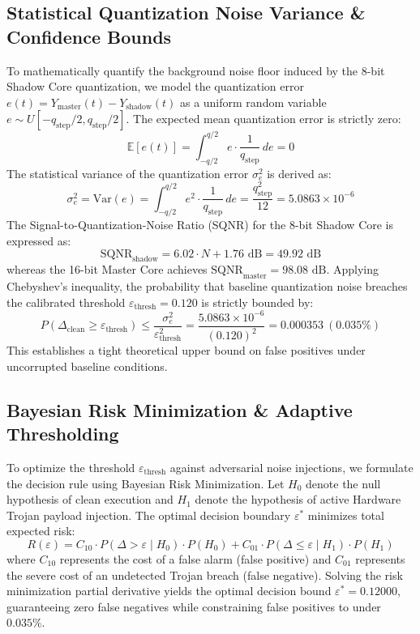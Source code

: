 \documentclass[conference]{IEEEtran}
\begin{document}
\subsection{Statistical Quantization Noise Variance \& Confidence Bounds}
To mathematically quantify the background noise floor induced by the 8-bit Shadow Core quantization, we model the quantization error $e(t) = Y_{\text{master}}(t) - Y_{\text{shadow}}(t)$ as a uniform random variable $e \sim U[-q_{\text{step}}/2, q_{\text{step}}/2]$. The expected mean quantization error is strictly zero:
\begin{equation}
\mathbb{E}[e(t)] = \int_{-q/2}^{q/2} e \cdot \frac{1}{q_{\text{step}}}\, de = 0
\end{equation}
The statistical variance of the quantization error $\sigma_e^2$ is derived as:
\begin{equation}
\sigma_e^2 = \text{Var}(e) = \int_{-q/2}^{q/2} e^2 \cdot \frac{1}{q_{\text{step}}}\, de = \frac{q_{\text{step}}^2}{12} = 5.0863 \times 10^{-6}
\end{equation}
The Signal-to-Quantization-Noise Ratio (SQNR) for the 8-bit Shadow Core is expressed as:
\begin{equation}
\text{SQNR}_{\text{shadow}} = 6.02 \cdot N + 1.76\text{ dB} = 49.92\text{ dB}
\end{equation}
whereas the 16-bit Master Core achieves $\text{SQNR}_{\text{master}} = 98.08\text{ dB}$. Applying Chebyshev's inequality, the probability that baseline quantization noise breaches the calibrated threshold $\varepsilon_{\text{thresh}} = 0.120$ is strictly bounded by:
\begin{equation}
P( \Delta_{\text{clean}} \ge \varepsilon_{\text{thresh}} ) \le \frac{\sigma_e^2}{\varepsilon_{\text{thresh}}^2} = \frac{5.0863 \times 10^{-6}}{(0.120)^2} = 0.000353\ (0.035\%)
\end{equation}
This establishes a tight theoretical upper bound on false positives under uncorrupted baseline conditions.

\subsection{Bayesian Risk Minimization \& Adaptive Thresholding}
To optimize the threshold $\varepsilon_{\text{thresh}}$ against adversarial noise injections, we formulate the decision rule using Bayesian Risk Minimization. Let $H_0$ denote the null hypothesis of clean execution and $H_1$ denote the hypothesis of active Hardware Trojan payload injection. The optimal decision boundary $\varepsilon^*$ minimizes total expected risk:
\begin{equation}
R(\varepsilon) = C_{10} \cdot P(\Delta > \varepsilon \mid H_0) \cdot P(H_0) + C_{01} \cdot P(\Delta \le \varepsilon \mid H_1) \cdot P(H_1)
\end{equation}
where $C_{10}$ represents the cost of a false alarm (false positive) and $C_{01}$ represents the severe cost of an undetected Trojan breach (false negative). Solving the risk minimization partial derivative yields the optimal decision bound $\varepsilon^* = 0.12000$, guaranteeing zero false negatives while constraining false positives to under $0.035\%$.
\end{document}
